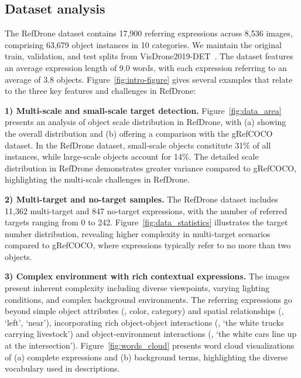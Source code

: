 \subsection{Dataset analysis}
The RefDrone dataset contains 17,900 referring expressions across 8,536 images, comprising 63,679 object instances in 10 categories. We maintain the original train, validation, and test splits from VisDrone2019-DET~\cite{visdrone}. The dataset features an average expression length of 9.0 words, with each expression referring to an average of 3.8 objects. Figure~\ref{fig:intro-figure} gives several examples that relate to the three key features and challenges in RefDrone:\par


\noindent\textbf{1) Multi-scale and small-scale target detection.} Figure~\ref{fig:data_area} presents an analysis of object scale distribution in RefDrone, with (a) showing the overall distribution and (b) offering a comparison with the gRefCOCO~\cite{grefcoco} dataset. In the RefDrone dataset, small-scale objects constitute 31\% of all instances, while large-scale objects account for 14\%. The detailed scale distribution in RefDrone demonstrates greater variance compared to gRefCOCO, highlighting the multi-scale challenges in RefDrone.\par


\noindent\textbf{2) Multi-target and no-target samples.} The RefDrone dataset includes 11,362 multi-target and 847 no-target expressions, with the number of referred targets ranging from 0 to 242. Figure~\ref{fig:data_statistics} illustrates the target number distribution, revealing higher complexity in multi-target scenarios compared to gRefCOCO, where expressions typically refer to no more than two objects. \par


\noindent\textbf{3) Complex environment with rich contextual expressions.} 
The images present inherent complexity including diverse viewpoints, varying lighting conditions, and complex background environments. The referring expressions go beyond simple object attributes (\eg, color, category) and spatial relationships (\eg, `left', `near'), incorporating rich object-object interactions (\eg, `the white trucks carrying livestock') and object-environment interactions (\eg, `the white cars line up at the intersection'). Figure~\ref{fig:words_cloud} presents word cloud visualizations of (a) complete expressions and (b) background terms, highlighting the diverse vocabulary used in descriptions.\par



